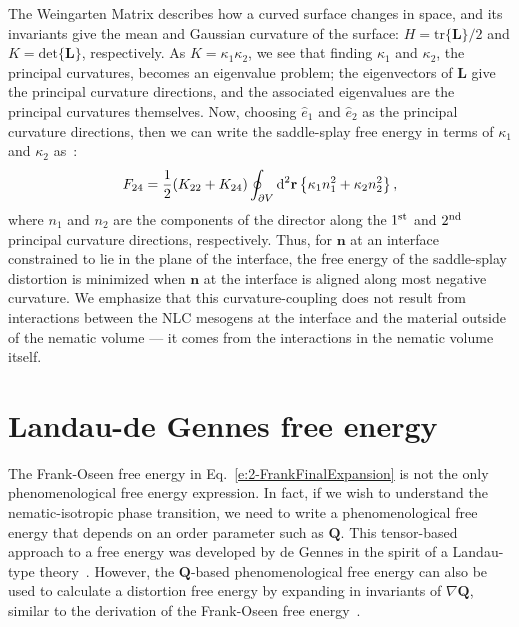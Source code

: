 The Weingarten Matrix describes how a curved surface changes in space, and its invariants give the mean and Gaussian curvature of the surface: $H = \textrm{tr}\{\mathbf{L}\}/2$ and $K = \textrm{det} \{ \mathbf{L} \}$, respectively.
As $K = \kappa_1 \kappa_2$, we see that finding $\kappa_1$ and $\kappa_2$, the principal curvatures, becomes an eigenvalue problem; the eigenvectors of $\mathbf{L}$ give the principal curvature directions, and the associated eigenvalues are the principal curvatures themselves.
Now, choosing $\hat{e}_1$ and $\hat{e}_2$ as the principal curvature directions, then we can write the saddle-splay free energy in terms of $\kappa_1$ and $\kappa_2$ as~\cite{RN59}:
\begin{equation}
  F_{24} = \frac{1}{2}(K_{22} + K_{24})
  \oint_{\partial V}\textup{d}^2 \mathbf{r} \left \{\kappa_1 n_1^2 + \kappa_2 n_2^2 \right \},\label{e:2-K24SurfCouple}
\end{equation}
where $n_1$ and $n_2$ are the components of the director along the $1^{\rm st}$ and $2^{\rm nd}$ principal curvature directions, respectively.
Thus, for $\mathbf{n}$ at an interface constrained to lie in the plane of  the interface, the free energy of the saddle-splay distortion is minimized when $\mathbf{n}$ at the interface is aligned along most negative curvature.
We emphasize that this curvature-coupling does not result from interactions between the NLC mesogens at the interface and the material outside of the nematic volume --- it comes from the interactions in the nematic volume itself.




\section{Landau-de Gennes free energy}
The Frank-Oseen free energy in Eq.~\ref{e:2-FrankFinalExpansion} is not the only phenomenological free energy expression.
In fact, if we wish to understand the nematic-isotropic phase transition, we need to write a phenomenological free energy that depends on an order parameter such as $\mathbf{Q}$.
This tensor-based approach to a free energy was developed by de Gennes in the spirit of a Landau-type theory~\cite{RN33}.
However, the $\mathbf{Q}$-based phenomenological free energy can also be used to calculate a distortion free energy by expanding in invariants of $\nabla \mathbf{Q}$, similar to the derivation of the Frank-Oseen free energy~\cite{RN33,RN189,RN198}.


